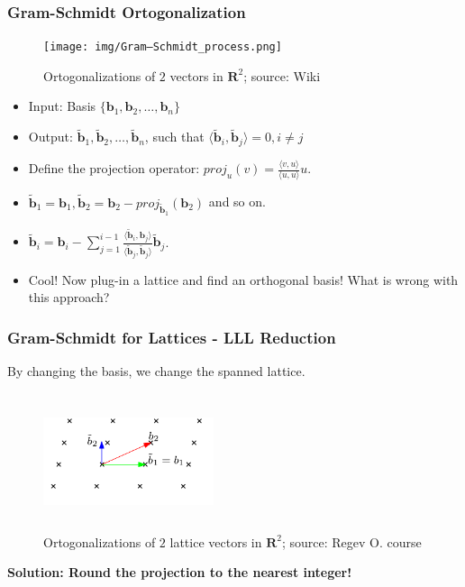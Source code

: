 \documentclass{beamer}
\begin{document}
\begin{frame}
    \frametitle{Gram-Schmidt Ortogonalization}
        \begin{figure}
            \texttt{[image: img/Gram–Schmidt\_process.png]}
            \caption{Ortogonalizations of $2$ vectors in $\mathbf{R}^2$; source: Wiki}
        \end{figure}

    \begin{itemize}
        \item Input: Basis $\{ \mathbf{b}_1, \mathbf{b}_2, \dots , \mathbf{b}_n \} $
        \pause \item Output: $\tilde{\mathbf{b}}_1, \tilde{\mathbf{b}}_2, \dots, \tilde{\mathbf{b}}_n$, such that $ \langle \tilde{\mathbf{b}}_i, \tilde{\mathbf{b}}_j \rangle = 0, i \neq j$ 
        \pause \item Define the projection operator: $proj_{u}(v) = \frac{\langle v, u \rangle}{\langle u, u \rangle}u$.
        \pause \item $\tilde{\mathbf{b}}_1 = \mathbf{b}_1, \tilde{\mathbf{b}}_2 = \mathbf{b}_2 - proj_{\tilde{\mathbf{b}}_1}({\mathbf{b}}_2)$ and so on.
        \pause \item $\tilde{\mathbf{b}}_i = \mathbf{b}_i - \sum_{j=1}^{i-1}{\frac{\langle \tilde{\mathbf{b}}_i, \mathbf{b}_j \rangle}{\langle \tilde{\mathbf{b}}_j, \tilde{\mathbf{b}}_j \rangle} \tilde{\mathbf{b}}_j}$.
        \pause \item Cool! Now plug-in a lattice and find an orthogonal basis! \pause What is wrong with this approach?
    \end{itemize}
\end{frame}

\begin{frame}
    \frametitle{Gram-Schmidt for Lattices - LLL Reduction}
    By changing the basis, we change the spanned lattice.
    \begin{figure}
            \includegraphics[width=5cm,height=4cm,keepaspectratio]{img/gram-schmidt.png}
            \caption{Ortogonalizations of $2$ lattice vectors in $\mathbf{R}^2$; source: Regev O. course}
        \end{figure}

    \pause \textbf{Solution: Round the projection to the nearest integer!}
\end{frame}
\end{document}
